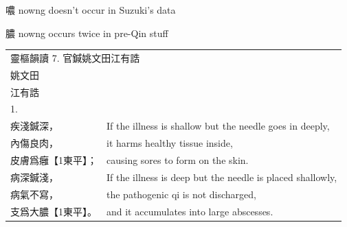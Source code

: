 噥 nowng doesn't occur in Suzuki's data 

膿 nowng occurs twice in pre-Qin stuff 


\begin{longtable}{p{} p{}}

\multicolumn{2}{l}{靈樞韻讀 7. 官鍼姚文田江有誥}\\
\multicolumn{2}{l}{姚文田}\\
\multicolumn{2}{l}{江有誥}\\
\multicolumn{2}{l}{1.}\\









疾淺鍼深， &
If the illness is shallow but the needle goes in deeply,\\

內傷良肉， &
it harms healthy tissue inside,\\

皮膚爲癰【1東平】； &
causing sores to form on the skin.\\

病深鍼淺， &
If the illness is deep but the needle is placed shallowly,\\

病氣不寫， &
the pathogenic qi is not discharged,\\

支爲大膿【1東平】。 &
and it accumulates into large abscesses.\\


\end{longtable}

